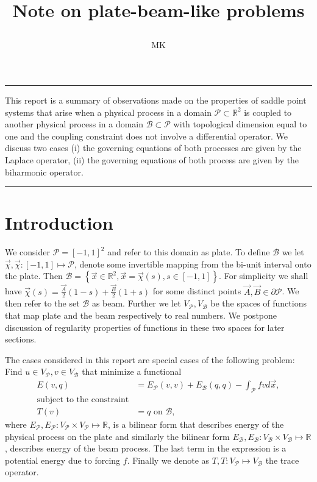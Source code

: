 \documentclass[a4paper,10pt]{article}
\newcommand{\R}{\ensuremath{\mathbb{R}}}
\newcommand{\Vp}{\ensuremath{V_{\mathcal{P}}}}
\newcommand{\Vb}{\ensuremath{V_{\mathcal{B}}}}
\newcommand{\Ep}{\ensuremath{E_{\mathcal{P}}}}
\newcommand{\Eb}{\ensuremath{E_{\mathcal{B}}}}
\renewenvironment{abstract}{%
\hfill\begin{minipage}{0.95\textwidth}
\rule{\textwidth}{1pt}}
{\par\noindent\rule{\textwidth}{1pt}\end{minipage}}
\begin{document}
%
\title{\begin{center}
        Note on plate-beam-like problems
       \end{center}}
\author[1]{MK}
%
\maketitle
%
\begin{abstract}
  This report is a summary of observations made on the properties of saddle
  point systems that arise when a physical process in a domain
  $\mathcal{P}\subset\R^2$ is coupled to another physical process in a domain
  $\mathcal{B}\subset\mathcal{P}$ with topological dimension equal to one and
  the coupling constraint does not involve a differential operator. We discuss
  two cases (i) the governing equations of both processes are given by the
  Laplace operator, (ii) the governing equations of both process are given by
  the biharmonic operator.
\end{abstract}

\section{Introduction}
  We consider $\mathcal{P}=\left[-1, 1\right]^2$ and refer to this domain as
  plate. To define $\mathcal{B}$ we let
  $\vec{\chi}, \vec{\chi}:\left[-1, 1\right]\mapsto\mathcal{P}$, denote some
  invertible mapping from the bi-unit interval onto the plate. Then
  $\mathcal{B}=\left\{\vec{x}\in\R^2, \vec{x}=\vec{\chi}(s), s\in\left[-1,
  1\right]\right\}$. For simplicity we shall have
  $\vec{\chi}(s)=\frac{\vec{A}}{2}(1-s) +\frac{\vec{B}}{2}(1+s)$ for some
  distinct points $\vec{A}, \vec{B}\in\partial\mathcal{P}$. We then refer to
  the set $\mathcal{B}$ as beam. Further we let $V_{\mathcal{P}}, V_{\mathcal{B}}$
  be the spaces of functions that map plate and the beam respectively to real
  numbers. We postpone discussion of regularity properties of functions in these
  two spaces for later sections.

  The cases considered in this report are special cases of the following
  problem: Find $u\in\Vp, v\in\Vb$ that minimize a functional
  \begin{equation}
    \label{eq:energy}
    \begin{aligned}
      E(v, q) &= \Ep(v, v) + \Eb(q, q) - \int_{\mathcal{P}}f v d\vec{x}, \\
      \text{subject to the constraint}&\\
      T(v) &= q\text{ on }\mathcal{B},
    \end{aligned}
  \end{equation}
  where $\Ep, \Ep: \Vp\times\Vp\mapsto\R$, is a bilinear form that describes
  energy of the physical process on the plate and similarly the bilinear form
  $\Eb, \Eb:\Vb\times\Vb\mapsto\R$, describes energy of the beam process. The
  last term in the expression is a potential energy due to forcing $f$. Finally
  we denote as $T, T:\Vp\mapsto\Vb$ the trace operator.
  
\end{document}
